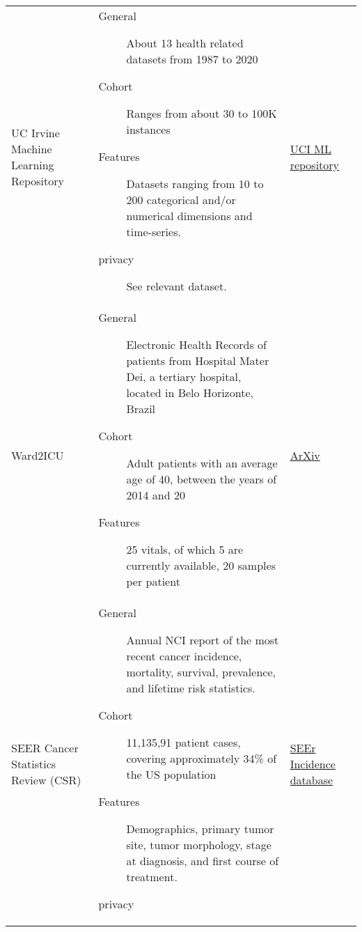\begin{table}
\begin{tabular}{@{}p{} p{}p{}@{}}
    UC Irvine Machine Learning Repository \cite{Dua:2019} & \begin{description} \item[General] About 13 health related datasets from 1987 to 2020 \item[Cohort] Ranges from about 30 to 100K instances \item[Features] Datasets ranging from 10 to 200 categorical and/or numerical dimensions and time-series. \item[privacy] See relevant dataset. \end{description} & \href{http://archive.ics.uci.edu/ml/index.php }{UCI ML repository}\\
    
    Ward2ICU \cite{severo2019ward2icu} & \begin{description} \item[General] Electronic Health Records of patients from Hospital Mater Dei, a tertiary hospital, located in Belo Horizonte, Brazil \item[Cohort] Adult patients with an average age of 40, between the years of 2014 and 20 \item[Features] 25 vitals, of which 5 are currently available, 20 samples per patient \end{description} & \href{https://arxiv.org/abs/1910.00752}{ArXiv}\\
    
    SEER Cancer Statistics Review (CSR) \cite{noone2018cronin}  & \begin{description} \item[General] Annual NCI report of the most recent cancer incidence, mortality, survival, prevalence, and lifetime risk statistics. \item[Cohort] 11,135,91 patient cases, covering approximately 34\% of the US population \item[Features] Demographics, primary tumor site, tumor morphology, stage at diagnosis, and first course of treatment. \item[privacy] \end{description} & \href{https://seer.cancer.gov/data/access.html}{SEEr Incidence database}\\
    

\end{tabular}
\end{table}
